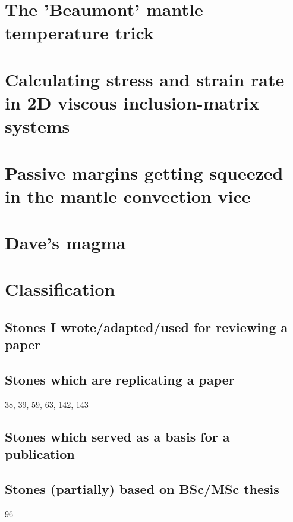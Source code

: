 \documentclass[a4paper,11pt]{report}
\begin{document}
\chapter{The 'Beaumont' mantle temperature trick \label{f141}} %

\chapter{Calculating stress and strain rate in 2D viscous inclusion-matrix systems \label{f142}} %

\chapter{Passive margins getting squeezed in the mantle convection vice \label{f143}} %

\chapter{Dave's magma \label{f144}} %

\appendix
\chapter{Classification}

\section{
Stones I wrote/adapted/used for reviewing a paper}

\section{
Stones which are replicating a paper}

38, 39, 59, 63, 142, 143

\section{
Stones which served as a basis for a publication}



\section{
Stones (partially) based on BSc/MSc thesis}

96






\printbibliography
\end{document}
